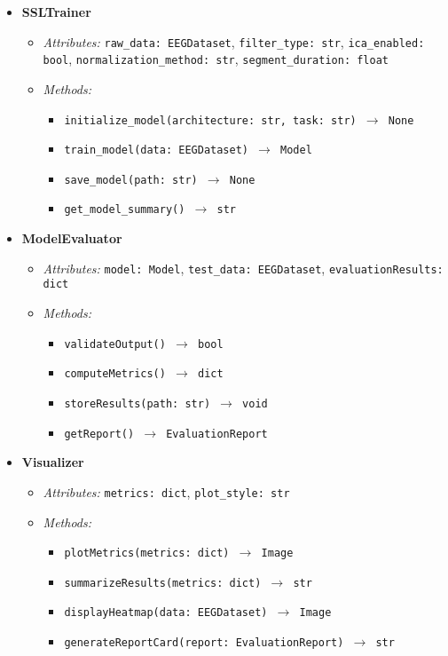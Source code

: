 \begin{itemize}
    \item \textbf{SSLTrainer}
    \begin{itemize}
        \item \textit{Attributes:} \texttt{raw\_data: EEGDataset}, \texttt{filter\_type: str}, \texttt{ica\_enabled: bool}, \texttt{normalization\_method: str}, \texttt{segment\_duration: float}
        \item \textit{Methods:}
        \begin{itemize}
            \item \texttt{initialize\_model(architecture: str, task: str) $\rightarrow$ None}
            \item \texttt{train\_model(data: EEGDataset) $\rightarrow$ Model}
            \item \texttt{save\_model(path: str) $\rightarrow$ None}
            \item \texttt{get\_model\_summary() $\rightarrow$ str}
        \end{itemize}
    \end{itemize}

    \item \textbf{ModelEvaluator}
    \begin{itemize}
        \item \textit{Attributes:} \texttt{model: Model}, \texttt{test\_data: EEGDataset}, \texttt{evaluationResults: dict}
        \item \textit{Methods:}
        \begin{itemize}
            \item \texttt{validateOutput() $\rightarrow$ bool}
            \item \texttt{computeMetrics() $\rightarrow$ dict}
            \item \texttt{storeResults(path: str) $\rightarrow$ void}
            \item \texttt{getReport() $\rightarrow$ EvaluationReport}
        \end{itemize}
    \end{itemize}

    \item \textbf{Visualizer}
    \begin{itemize}
        \item \textit{Attributes:} \texttt{metrics: dict}, \texttt{plot\_style: str}
        \item \textit{Methods:}
        \begin{itemize}
            \item \texttt{plotMetrics(metrics: dict) $\rightarrow$ Image}
            \item \texttt{summarizeResults(metrics: dict) $\rightarrow$ str}
            \item \texttt{displayHeatmap(data: EEGDataset) $\rightarrow$ Image}
            \item \texttt{generateReportCard(report: EvaluationReport) $\rightarrow$ str}
        \end{itemize}
    \end{itemize}


\end{itemize}
